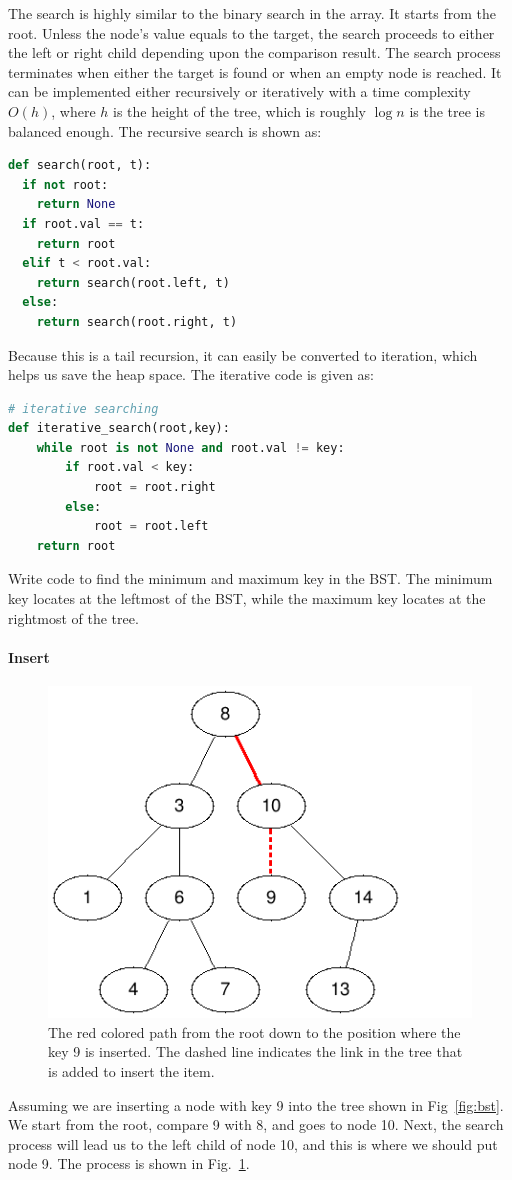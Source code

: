 \documentclass[main.tex]{subfiles}
\begin{document}
The search is highly similar to the binary search in the array. It starts from the root. Unless the node's value equals to the target, the search proceeds to either the left or right child depending upon the comparison result. The search process terminates when either the target is found or when an empty node is reached. It can be implemented either recursively or iteratively with a time complexity $O(h)$, where $h$ is the height of the tree, which is roughly $\log n$ is the tree is balanced enough. The recursive search is shown as:
\begin{lstlisting}[language = Python]
def search(root, t):
  if not root:
    return None
  if root.val == t:
    return root
  elif t < root.val:
    return search(root.left, t)
  else:
    return search(root.right, t)
\end{lstlisting}
Because this is a tail recursion, it can easily be converted to iteration,  which helps us save the heap space. The iterative code is given as:
\begin{lstlisting}[language = Python]
# iterative searching
def iterative_search(root,key):
    while root is not None and root.val != key:
        if root.val < key:
            root = root.right
        else:
            root = root.left
    return root
\end{lstlisting}

\begin{bclogo}[couleur = blue!30, arrondi=0.1,logo=\bccrayon,ombre=true]{Write code to find the minimum and maximum key in the BST. } The minimum key locates at the leftmost of the BST, while the maximum key locates at the rightmost of the tree. 
\end{bclogo}

\paragraph{Insert}
\begin{figure}[H]
    \centering
    \includegraphics[width=0.6\columnwidth]{fig/bst_insert_9.png}
    \caption{The red colored path  from the root down to the position where the key 9 is inserted. The dashed line indicates the link in the tree that is added to insert the item. }
    \label{fig:bst_insert}
\end{figure}
Assuming we are inserting a node with key 9 into the tree shown in Fig~\ref{fig:bst}. We start from the root, compare 9 with 8, and goes to node 10. Next, the search process will lead us to the left child of node 10, and this is where we should put node 9. The process is shown in Fig.~\ref{fig:bst_insert}. 
\end{document}
